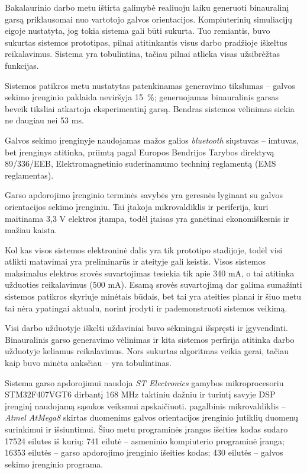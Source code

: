 \documentclass[]{vgtuef}
\begin{document}
Bakalaurinio darbo metu ištirta galimybė realiuoju laiku generuoti binauralinį garsą priklausomai nuo vartotojo galvos orientacijos. Kompiuterinių simuliacijų eigoje nustatyta, jog tokia sistema gali būti sukurta. Tuo remiantis, buvo sukurtas sistemos prototipas, pilnai atitinkantis visus darbo pradžioje iškeltus reikalavimus. Sistema yra tobulintina, tačiau pilnai atlieka visas užsibrėžtas funkcijas.

Sistemos patikros metu nustatytas patenkinamas generavimo tikslumas -- galvos sekimo įrenginio paklaida neviršyja 15~\%; generuojamas binauralinis garsas beveik tiksliai atkartoja eksperimentinį garsą. Bendras sistemos vėlinimas siekia ne daugiau nei 53 ms.

Galvos sekimo įrenginyje naudojamas mažos galios \textit{bluetooth} siųstuvas -- imtuvas, bet įrenginys atitinka, priimtą pagal Europos Bendrijos Tarybos direktyvą 89/336/EEB, Elektromagnetinio suderinamumo techninį reglamentą (EMS reglamentas).

Garso apdorojimo įrenginio terminės savybės yra geresnės lyginant su galvos orientacijos sekimo įrenginiu. Tai įtakoja mikrovaldiklis ir periferija, kuri maitinama 3,3 V elektros įtampa, todėl įtaisas yra ganėtinai ekonomiškesnis ir mažiau kaista.

Kol kas visos sistemos elektroninė dalis yra tik prototipo stadijoje, todėl visi atlikti matavimai yra preliminarūs ir ateityje gali keistis. Visos sistemos maksimalus elektros srovės suvartojimas tesiekia tik apie 340 mA, o tai atitinka užduoties reikalavimus (500 mA). Esamą srovės suvartojimą dar galima sumažinti sistemos patikros skyriuje minėtais būdais, bet tai yra ateities planai ir šiuo metu tai nėra ypatingai aktualu, norint įrodyti ir pademonstruoti sistemos veikimą.

Visi darbo užduotyje iškelti uždaviniai buvo sėkmingai išspręsti ir įgyvendinti. Binauralinis garso generavimo vėlinimas ir kita sistemos perfirija atitinka darbo užduotyje keliamus reikalavimus. Nors sukurtas algoritmas veikia gerai, tačiau kaip buvo minėta anksčiau -- yra tobulintinas. 

Sistema garso apdorojimui naudoja \textit{ST Electronics} gamybos mikroprocesoriu STM32F407VGT6 dirbantį 168 MHz taktiniu dažniu ir turintį savyje DSP  įrenginį naudojamą sąsukos veiksmui apskaičiuoti. pagalbinis mikrovaldiklis -- \textit{Atmel AtMega8} skirtas duomenims galvos orientacijos įrenginio jutiklių duomenų surinkimui ir išsiuntimui. Šiuo metu programinės įrangos išeities kodas sudaro 17524 eilutes iš kurių: 741 eilutė -- asmeninio kompiuterio programinė įranga; 16353 eilutės -- garso apdorojimo įrenginio išeities kodas; 430 eilutės -- galvos sekimo įrenginio programa.
\end{document}
